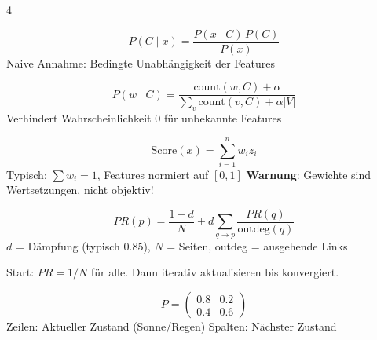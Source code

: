 \begin{landscape}
\begin{multicols*}{4}

		\begin{cheatSheetBox}[title=Bayes-Theorem]
			\[
				P(C\mid x) = \frac{P(x\mid C) \, P(C)}{P(x)}
			\]
			Naive Annahme: Bedingte Unabhängigkeit der Features
		\end{cheatSheetBox}

		\begin{cheatSheetBox}[title=Laplace-Glättung]
			\[
				P(w\mid C) = \frac{\text{count}(w,C) + \alpha}{\sum_v \text{count}(v,C) + \alpha|V|}
			\]
			Verhindert Wahrscheinlichkeit 0 für unbekannte Features
		\end{cheatSheetBox}


		\begin{cheatSheetBox}[title=Scoring-Formel]
			\[
				\text{Score}(x) = \sum_{i=1}^n w_i z_i
			\]
			Typisch: $\sum w_i = 1$, Features normiert auf $[0,1]$
			\textbf{Warnung}: Gewichte sind Wertsetzungen, nicht objektiv!
		\end{cheatSheetBox}


		\begin{cheatSheetBox}[title=PageRank-Formel]
			\[
				PR(p) = \frac{1-d}{N} + d\sum_{q \to p}\frac{PR(q)}{\text{outdeg}(q)}
			\]
			$d$ = Dämpfung (typisch 0.85), $N$ = Seiten, outdeg = ausgehende Links
		\end{cheatSheetBox}

		\begin{cheatSheetBox}[title=Iterativer Prozess]
			Start: $PR = 1/N$ für alle. Dann iterativ aktualisieren bis konvergiert.
		\end{cheatSheetBox}

		\columnbreak


		\begin{cheatSheetBox}[title=Übergangsmatrix (Wetter)]
			\[
				P = \begin{pmatrix} 0.8 & 0.2 \\ 0.4 & 0.6 \end{pmatrix}
			\]
			Zeilen: Aktueller Zustand (Sonne/Regen)
			Spalten: Nächster Zustand
		\end{cheatSheetBox}


\end{multicols*}
\end{landscape}
